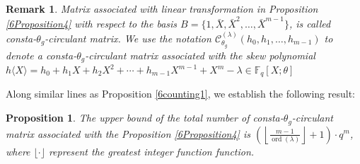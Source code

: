 \documentclass[12pt]{article}
\newtheorem{proposition}{Proposition}
\newtheorem{remark}{Remark}
\begin{document}
	\begin{remark}
		Matrix associated with linear transformation in Proposition \ref{6Proposition4} with respect to the  basis $B=\{1,\bar{X},\bar{X}^2,\dots,\bar{X}^{m-1}\}$, is called consta-$\theta_g$-circulant matrix. We use the notation $\mathcal{C}_{\theta_g}^{(\lambda)}(h_0, h_1, \ldots, h_{m-1})$ to denote a consta-$\theta_g$-circulant matrix associated with the skew polynomial
	$
		h\langle X \rangle = h_0 + h_1 X + h_2 X^2 + \cdots + h_{m-1} X^{m-1} +X^m-\lambda\in \mathbb{F}_q[X; \theta]$
\end{remark}
Along similar lines as Proposition \ref{6counting1}, we establish the following result:
\begin{proposition}
The upper bound of the total number of consta-$\theta_g$-\textup{circulant} matrix associated with the Proposition \ref{6Proposition4} is $\left( \left\lfloor \frac{m - 1}{\operatorname{ord}(\lambda)} \right\rfloor + 1 \right) \cdot q^m$, where  $\lfloor \cdot \rfloor$ represent the greatest integer function function.
\end{proposition}
\end{document}
